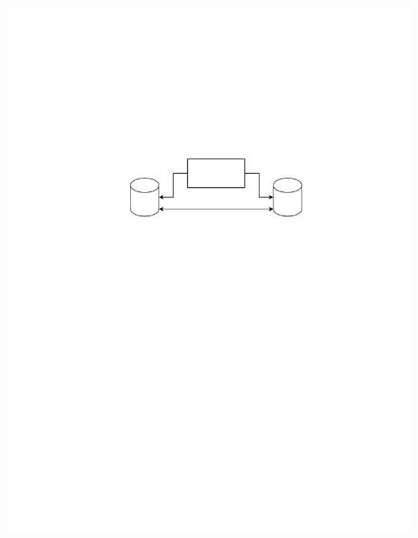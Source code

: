 \documentclass[10pt,twoside,slovak,a4paper]{article}
\begin{document}
\includegraphics[scale=0.5]{diagram.pdf}



\end{document}
